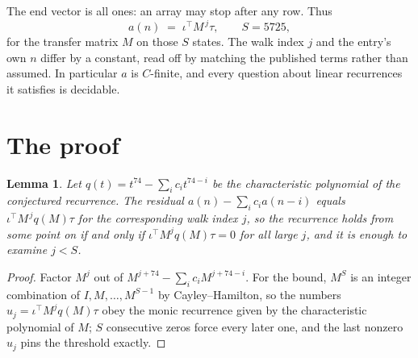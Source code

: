 \documentclass[11pt,a4paper]{article}
\theoremstyle{plain}
\newtheorem{lemma}[theorem]{Lemma}
\theoremstyle{definition}
\begin{document}
The end vector is all ones: an array may stop after any row. Thus
\[
a(n)\;=\;\iota^{\!\top}M^{\,j}\tau ,\qquad S=5725,
\]
for the transfer matrix $M$ on those $S$ states. The walk index $j$ and the entry's own $n$
differ by a constant, read off by matching the published terms rather than assumed. In
particular $a$ is $C$-finite, and every question about linear recurrences it satisfies is
decidable.

\section{The proof}

\begin{lemma}\label{lem:crit}
Let $q(t)=t^{74}-\sum_i c_it^{74-i}$ be the characteristic polynomial of the
conjectured recurrence. The residual $a(n)-\sum_ic_ia(n-i)$ equals
$\iota^{\!\top}M^{\,j}q(M)\tau$ for the corresponding walk index $j$, so the recurrence
holds from some point on if and only if $\iota^{\!\top}M^{j}q(M)\tau=0$ for all large $j$,
and it is enough to examine $j<S$.
\end{lemma}

\begin{proof}
Factor $M^{j}$ out of $M^{j+74}-\sum_ic_iM^{j+74-i}$. For the bound, $M^{S}$
is an integer combination of $I,M,\dots,M^{S-1}$ by Cayley--Hamilton, so the numbers
$u_j=\iota^{\!\top}M^{j}q(M)\tau$ obey the monic recurrence given by the characteristic
polynomial of $M$; $S$ consecutive zeros force every later one, and the last nonzero $u_j$
pins the threshold exactly.
\end{proof}
\end{document}
